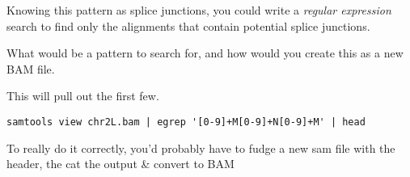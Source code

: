 \begin{advanced}
Knowing this pattern as splice junctions, you could write a \textit{regular expression} search to find only the alignments that contain potential splice junctions.
\begin{questions}
What would be a pattern to search for, and how would you create this as a new BAM file.
\end{questions}
\begin{answer}
This will pull out the first few.
\begin{lstlisting}
samtools view chr2L.bam | egrep '[0-9]+M[0-9]+N[0-9]+M' | head
\end{lstlisting}
To really do it correctly, you'd probably have to fudge a new sam file with the header, the cat the output \& convert to BAM
\end{answer}
\end{advanced}